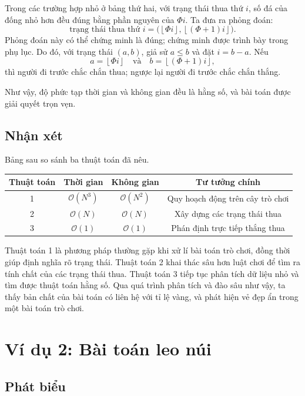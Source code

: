 \documentclass[11pt]{article}
\newcommand{\Oh}{\mathcal{O}}
\newcommand{\floor}[1]{\left\lfloor #1\right\rfloor}
\begin{document}
Trong các trường hợp nhỏ ở bảng thứ hai, với trạng thái thua thứ \(i\), số
đá của đống nhỏ hơn đều đúng bằng phần nguyên của \(\Phi i\). Ta đưa ra phỏng
đoán:
\[
  \text{trạng thái thua thứ } i
  =
  \bigl(\floor{\Phi i},\floor{(\Phi+1)i}\bigr).
\]
Phỏng đoán này có thể chứng minh là đúng; chứng minh được trình bày trong
phụ lục. Do đó, với trạng thái \((a,b)\), giả sử \(a\le b\) và đặt
\(i=b-a\). Nếu
\[
  a=\floor{\Phi i}
  \quad\text{và}\quad
  b=\floor{(\Phi+1)i},
\]
thì người đi trước chắc chắn thua; ngược lại người đi trước chắc chắn thắng.

Như vậy, độ phức tạp thời gian và không gian đều là hằng số, và bài toán được
giải quyết trọn vẹn.

\subsection{Nhận xét}

Bảng sau so sánh ba thuật toán đã nêu.

\begin{center}
\begin{tabular}{c|c|c|c}
\textbf{Thuật toán} & \textbf{Thời gian} & \textbf{Không gian} &
\textbf{Tư tưởng chính} \\
\hline
1 & \(\Oh(N^3)\) & \(\Oh(N^2)\) & Quy hoạch động trên cây trò chơi \\
2 & \(\Oh(N)\) & \(\Oh(N)\) & Xây dựng các trạng thái thua \\
3 & \(\Oh(1)\) & \(\Oh(1)\) & Phán định trực tiếp thắng thua \\
\end{tabular}
\end{center}

Thuật toán 1 là phương pháp thường gặp khi xử lí bài toán trò chơi, đồng thời
giúp định nghĩa rõ trạng thái. Thuật toán 2 khai thác sâu hơn luật chơi để
tìm ra tính chất của các trạng thái thua. Thuật toán 3 tiếp tục phân tích dữ
liệu nhỏ và tìm được thuật toán hằng số. Qua quá trình phân tích và đào sâu
như vậy, ta thấy bản chất của bài toán có liên hệ với tỉ lệ vàng, và phát
hiện vẻ đẹp ẩn trong một bài toán trò chơi.

\section{Ví dụ 2: Bài toán leo núi}

\subsection{Phát biểu}
\end{document}
